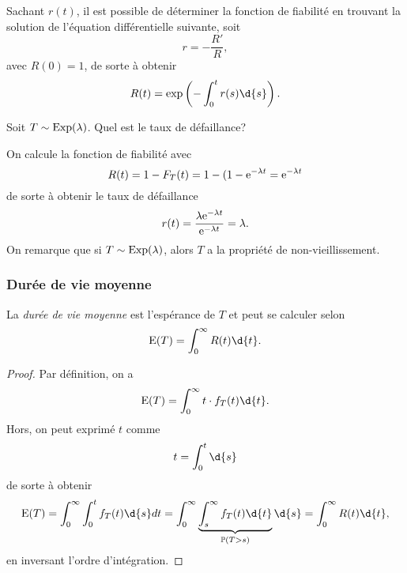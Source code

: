 \documentclass[11pt]{article}
\renewcommand\P{%
	\ensuremath{%
		\mathbb{P}%
	}%
}%
\newcommand\e{%
	\ensuremath{%
		\mathrm{e}%
	}%
}%
\newcommand\Exp{%
	\ensuremath{%
		\mathrm{Exp}%
	}%
}%
\newcommand\Esp{%
	\ensuremath{%
		\mathrm{E}%
	}%
}%
\begin{document}
Sachant $r(t)$, il est possible de déterminer la fonction de fiabilité en
trouvant la solution de l'équation différentielle suivante, soit
\begin{equation*}
	r=-\frac{R\prime}{R},
\end{equation*}
avec $R(0)=1$, de sorte à obtenir
\begin{equation*}
	R(t)=\exp\left(-\int_0^tr(s)\d{s}\right).
\end{equation*}

\pagebreak
\begin{exemple}
	Soit $T\sim\Exp(\lambda)$. Quel est le taux de défaillance?

	On calcule la fonction de fiabilité avec
	\begin{equation*}
		R(t)
		=1-F_T(t)
		=1-(1-\e^{-\lambda t}
		=\e^{-\lambda t}
	\end{equation*}
	de sorte à obtenir le taux de défaillance
	\begin{equation*}
		r(t)
		=\frac{\lambda\e^{-\lambda t}}{\e^{-\lambda t}}
		=\lambda.
	\end{equation*}
	On remarque que si $T\sim\Exp(\lambda)$, alors $T$ a la propriété de
	non-vieillissement.
\end{exemple}

\subsubsection{Durée de vie moyenne}
La \textit{durée de vie moyenne} est l'espérance de $T$ et peut se calculer
selon
\begin{equation*}
	\Esp(T)=\int_0^\infty R(t)\d{t}.
\end{equation*}

\begin{proof}
	Par définition, on a
	\begin{equation*}
		\Esp(T)=\int_0^\infty t\cdot f_T(t)\d{t}.
	\end{equation*}
	Hors, on peut exprimé $t$ comme
	\begin{equation*}
		t=\int_0^t\d{s}
	\end{equation*}
	de sorte à obtenir
	\begin{equation*}
		\Esp(T)
		=\int_0^\infty\int_0^t f_T(t)\d{s}d{t}
		=\int_0^\infty\underbrace{\int_s^\infty f_T(t)\d{t}}_{\P(T>s)}\d{s}
		=\int_0^\infty R(t)\d{t},
	\end{equation*}
	en inversant l'ordre d'intégration.
\end{proof}
\end{document}
